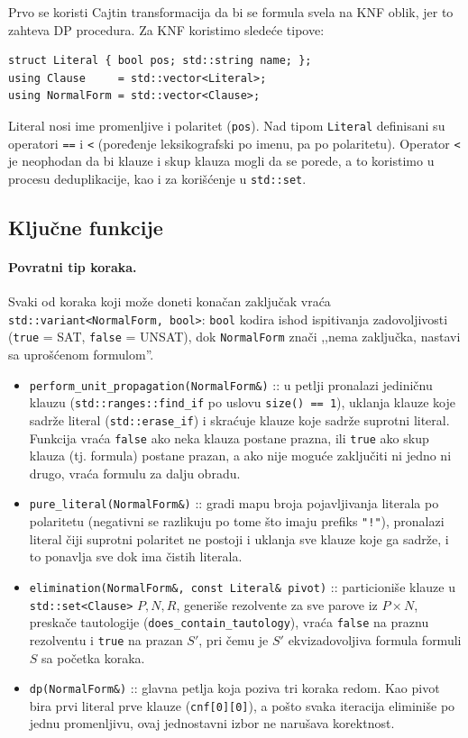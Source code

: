 \documentclass[a4paper,10pt]{article}
\begin{document}
Prvo se koristi Cajtin transformacija da bi se formula svela na KNF
oblik, jer to zahteva DP procedura. Za KNF koristimo sledeće tipove:

\begin{lstlisting}
struct Literal { bool pos; std::string name; };
using Clause     = std::vector<Literal>;
using NormalForm = std::vector<Clause>;
\end{lstlisting}

Literal nosi ime promenljive i polaritet (\verb|pos|). Nad tipom \verb|Literal| definisani su operatori \verb|==| i \verb|<| (poređenje leksikografski po imenu, pa po polaritetu). Operator \verb|<| je neophodan da bi klauze i skup klauza mogli da se porede, a to koristimo u procesu deduplikacije, kao i za korišćenje u \verb|std::set|.

\subsection{Ključne funkcije}

\paragraph{Povratni tip koraka.} Svaki od koraka koji može doneti konačan zaključak vraća \verb|std::variant<NormalForm, bool>|: \verb|bool| kodira ishod ispitivanja zadovoljivosti (\verb|true| = SAT, \verb|false| = UNSAT), dok \verb|NormalForm| znači ,,nema zaključka, nastavi sa uprošćenom formulom''. 

\begin{itemize}
  \item \verb|perform_unit_propagation(NormalForm&)| :: u petlji pronalazi jediničnu klauzu (\verb|std::ranges::find_if| po uslovu \verb|size() == 1|), uklanja klauze koje sadrže literal (\verb|std::erase_if|) i skraćuje klauze koje sadrže suprotni literal. Funkcija vraća \verb|false| ako neka klauza postane prazna, ili \verb|true| ako skup klauza (tj. formula) postane prazan, a ako nije moguće zaključiti ni jedno ni drugo, vraća formulu za dalju obradu.
  \item \verb|pure_literal(NormalForm&)| :: gradi mapu broja pojavljivanja literala po polaritetu (negativni se razlikuju po tome što imaju prefiks \verb|"!"|), pronalazi literal čiji suprotni polaritet ne postoji i uklanja sve klauze koje ga sadrže, i to ponavlja sve dok ima čistih literala.
  \item \verb|elimination(NormalForm&, const Literal& pivot)| :: particioniše klauze u \verb|std::set<Clause>| $P, N, R$, generiše rezolvente za sve parove iz $P \times N$, preskače tautologije (\verb|does_contain_tautology|), vraća \verb|false| na praznu rezolventu i \verb|true| na prazan $S'$, pri čemu je $S'$ ekvizadovoljiva formula formuli $S$ sa početka koraka.
  \item \verb|dp(NormalForm&)| :: glavna petlja koja poziva tri koraka redom. Kao pivot bira prvi literal prve klauze (\verb|cnf[0][0]|), a pošto svaka iteracija eliminiše po jednu promenljivu, ovaj jednostavni izbor ne narušava korektnost.
  
\end{itemize}
\end{document}
